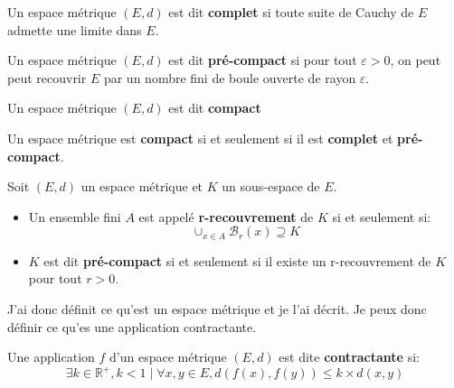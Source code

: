 \documentclass[a4paper, 12pt]{report}
\begin{document}
			\begin{definition}
				Un espace métrique $(E,d)$ est dit \textbf{complet} si toute suite de Cauchy de $E$ admette une limite dans $E$.
				\label{espMetriqueDef}
			\end{definition}
			
			\begin{definition}
				Un espace métrique $(E,d)$ est dit \textbf{pré-compact} si pour tout $\varepsilon >0$, on peut peut recouvrir $E$ par un nombre fini de boule ouverte de rayon $\varepsilon$.
			\end{definition}
			
			\begin{definition}
				Un espace métrique $(E,d)$ est dit \textbf{compact} 
			\end{definition}
			
			\begin{prop}
				Un espace métrique est \textbf{compact} si et seulement si il est \textbf{complet} et \textbf{pré-compact}.
			\end{prop}
			
			\begin{definition}
				Soit $(E,d)$ un espace métrique et $K$ un sous-espace de $E$.
				\begin{itemize}
					\item Un ensemble fini $A$ est appelé \textbf{r-recouvrement} de $K$ si et seulement si:
					\begin{equation*}
						\cup_{x\in A} \mathcal{B}_r(x)\supseteq K
					\end{equation*}
					\item $K$ est dit \textbf{pré-compact} si et seulement si il existe un r-recouvrement de $K$ pour tout $r>0$.

				\end{itemize}

			\end{definition}


			J'ai donc définit ce qu'est un espace métrique et je l'ai décrit. Je peux donc définir ce qu'es une application contractante.
			\begin{definition}
				Une application $f$ d'un espace métrique $(E,d)$ est dite \textbf{contractante} si:
				\begin{equation}
					\exists k\in\mathds{R}^+, k<1 \mid \forall x,y\in E, d(f(x),f(y))\leqslant k\times d(x,y)
					\label{Pcontractante}
				\end{equation}
			\end{definition}
			
\end{document}
